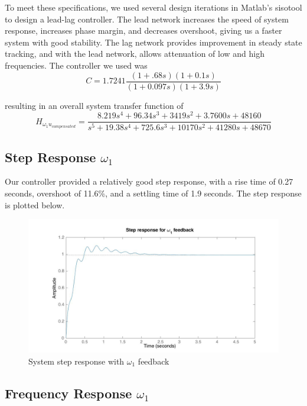 \documentclass[11pt,titlepage]{article}
\begin{document}
		To meet these specifications, we used several design iterations in Matlab's sisotool to design a lead-lag controller. The lead network increases the speed of system response, increases phase margin, and decreases overshoot, giving us a faster system with good stability. The lag network provides improvement in steady state tracking, and with the lead network, allows attenuation of low and high frequencies. The controller we used was 
		\begin{equation*}
		C = 1.7241\frac{(1+ .68s)(1+0.1s)}{(1+0.097s)(1+3.9s)}
		\end{equation*}
		
		resulting in an overall system transfer function of 
		\begin{equation*}
		H_{\omega_1u_{compensated}}=\frac{8.219 s^4 + 96.34 s^3 + 3419 s^2 + 3.7600 s + 48160}{s^5 + 19.38 s^4 + 725.6 s^3 + 10170 s^2 + 41280 s + 48670}  
		\end{equation*}

	\subsection{Step Response $\omega_1$}
		Our controller provided a relatively good step response, with a rise time of  0.27 seconds, overshoot of 11.6\%, and a settling time of 1.9 seconds. The step response is plotted below.
		
      	\begin{figure}[H]
        		\centering
        		\includegraphics[trim={=1cm 0 1cm 1cm},clip,origin=c,scale=0.35]{w1_step}
        		\caption{System step response with $\omega_1$ feedback}
        		\label{fig:w1_step}
    	\end{figure}
		
	\subsection{Frequency Response $\omega_1$}
	
\end{document}
